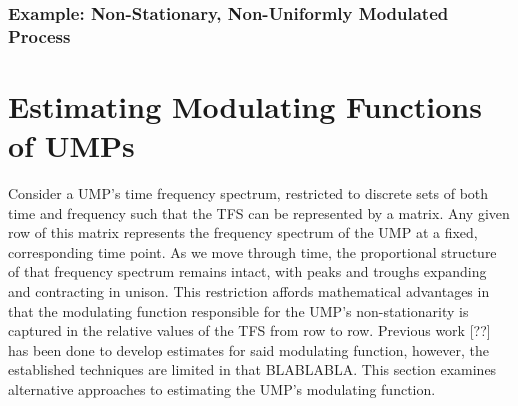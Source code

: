 \documentclass{article}
\begin{document}
\subsubsection{Example: Non-Stationary, Non-Uniformly Modulated Process}







\section{Estimating Modulating Functions of UMPs}
Consider a UMP's time frequency spectrum, restricted to discrete sets of both time and frequency such that the TFS can be represented by a matrix. Any given row of this matrix represents the frequency spectrum of the UMP at a fixed, corresponding time point. As we move through time, the proportional structure of that frequency spectrum remains intact, with peaks and troughs expanding and contracting in unison. This restriction affords mathematical advantages in that the modulating function responsible for the UMP's non-stationarity is captured in the relative values of the TFS from row to row. Previous work [??] has been done to develop estimates for said modulating function, however, the established techniques are limited in that BLABLABLA. This section examines alternative approaches to estimating the UMP's modulating function.
\end{document}
